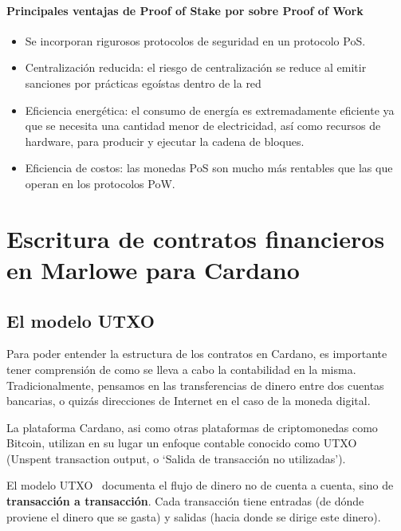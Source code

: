 \documentclass[12pt]{book}
\begin{document}
\subsubsection{Principales ventajas de Proof of Stake por sobre Proof of Work}

\begin{itemize}
    \item Se incorporan rigurosos protocolos de seguridad en un protocolo PoS.
    \item Centralización reducida: el riesgo de centralización se reduce al emitir sanciones por prácticas egoístas dentro de la red
    \item Eficiencia energética: el consumo de energía es extremadamente eficiente ya que se necesita una cantidad menor de electricidad, así como recursos de hardware, para producir y ejecutar la cadena de bloques.
    \item Eficiencia de costos: las monedas PoS son mucho más rentables que las que operan en los protocolos PoW.
\end{itemize}




\chapter{Escritura de contratos financieros en Marlowe para Cardano}

\section{El modelo UTXO} %

Para poder entender la estructura de los contratos en Cardano, es importante tener comprensión de como se lleva a cabo la contabilidad en la misma.
Tradicionalmente, pensamos en las transferencias de dinero entre dos cuentas bancarias, o quizás direcciones de Internet en el caso de la moneda digital.

La plataforma Cardano, asi como otras plataformas de criptomonedas como Bitcoin, utilizan en su lugar un enfoque contable conocido como UTXO~\cite{cardano_utxo_ledger} (Unspent transaction output, o `Salida de transacción no utilizadas').

El modelo UTXO~\cite{Translating_and_Unifying_UTXO-based}\cite{UTxO_Lars} documenta el flujo de dinero no de cuenta a cuenta, sino de \textbf{transacción a transacción}. Cada transacción tiene entradas (de dónde proviene el dinero que se gasta) y salidas (hacia donde se dirige este dinero).
\end{document}
